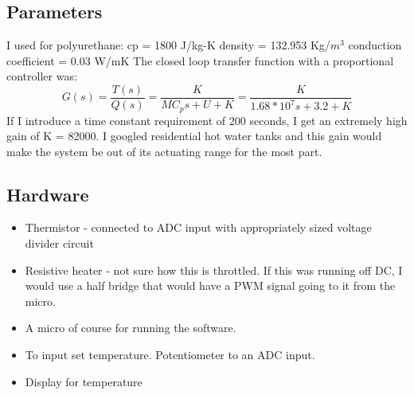 \subsection *{Parameters}
I used for polyurethane:
cp = 1800 J/kg-K
density = 132.953 Kg/$m^3$
conduction coefficient = 0.03 W/mK
\noindent
The closed loop transfer function with a proportional controller was:
\begin{equation}
G(s) = \frac{T(s)}{Q(s)} = \frac{K}{M C_p s + U + K} = \frac{K}{1.68 *10^7 s + 3.2 + K}
\end{equation}
\noindent
If I introduce a time constant requirement of 200 seconds, I get an extremely high gain of K = 82000. I googled residential hot water tanks and this gain would make the system be out of its actuating range for the most part.

\subsection *{Hardware}
\begin{itemize}
  \item Thermistor - connected to ADC input with appropriately sized voltage divider circuit
  \item Resistive heater - not sure how this is throttled. If this was running off DC, I would use a half bridge that would have a PWM signal going to it from the micro.
  \item A micro of course for running the software.
  \item To input set temperature. Potentiometer to an ADC input.
  \item Display for temperature
\end{itemize}